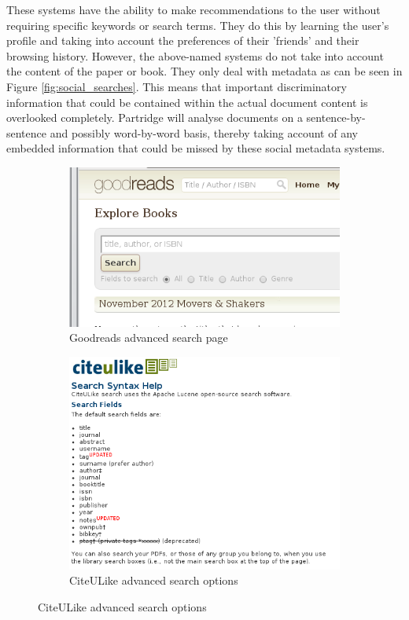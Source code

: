 \documentclass[12pt,a4paper]{article}
\begin{document}
These systems have the ability to make recommendations to the user without
requiring specific keywords or search terms. They do this by learning the
user's profile and taking into account the preferences of their 'friends' and
their browsing history. However, the above-named systems do not take into
account the content of the paper or book. They only deal with metadata as can
be seen in Figure \ref{fig:social_searches}. This means that important
discriminatory information that could be contained within the actual document
content is overlooked completely. Partridge will analyse documents on a
sentence-by-sentence and possibly word-by-word basis, thereby taking account of
any embedded information that could be missed by these social metadata systems.

\begin{figure}[!hbt]
        \centering
        \begin{subfigure}[b]{0.50\textwidth}
                \centering
                \includegraphics[width=\textwidth]{images/goodreads_search.png}
                \caption{Goodreads advanced search page}
                \label{fig:goodreads_search}
        \end{subfigure}%
        \begin{subfigure}[b]{0.50\textwidth}
                \centering
                \includegraphics[width=\textwidth]{images/citeulike_search.png}
                \caption{CiteULike advanced search options}
                \label{fig:citeulike_search}
        \end{subfigure}


\end{figure}
\end{document}
